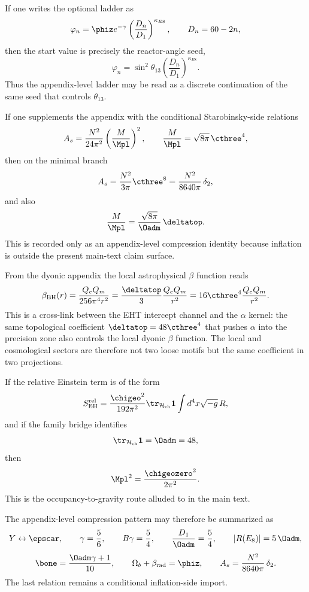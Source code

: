 \begin{remark}
If one writes the optional ladder as
\[
\varphi_n=\phiz e^{-\gamma}\left(\frac{D_n}{D_1}\right)^{\kappa_{E8}},
\qquad
D_n=60-2n,
\]
then the start value is precisely the reactor-angle seed,
\[
\varphi_n=\sin^2\theta_{13}\left(\frac{D_n}{D_1}\right)^{\kappa_{E8}}.
\]
Thus the appendix-level ladder may be read as a discrete continuation of the same seed that controls $\theta_{13}$.
\end{remark}

\begin{remark}
If one supplements the appendix with the conditional Starobinsky-side relations
\[
A_s=\frac{N^2}{24\pi^2}\left(\frac{M}{\Mpl}\right)^2,
\qquad
\frac{M}{\Mpl}=\sqrt{8\pi}\,\cthree^4,
\]
then on the minimal branch
\[
A_s=\frac{N^2}{3\pi}\cthree^8=\frac{N^2}{8640\pi}\,\delta_2,
\]
and also
\[
\frac{M}{\Mpl}=\frac{\sqrt{8\pi}}{\Oadm}\,\deltatop.
\]
This is recorded only as an appendix-level compression identity because inflation is outside the present main-text claim surface.
\end{remark}

\begin{remark}
From the dyonic appendix the local astrophysical $\beta$ function reads
\[
\beta_{\mathrm{BH}}(r)=\frac{Q_eQ_m}{256\pi^4 r^2}=\frac{\deltatop}{3}\frac{Q_eQ_m}{r^2}=16\cthree^4\frac{Q_eQ_m}{r^2}.
\]
This is a cross-link between the EHT intercept channel and the $\alpha$ kernel: the same topological coefficient $\deltatop=48\cthree^4$ that pushes $\alpha$ into the precision zone also controls the local dyonic $\beta$ function. The local and cosmological sectors are therefore not two loose motifs but the same coefficient in two projections.
\end{remark}

\begin{remark}
If the relative Einstein term is of the form
\[
S_{\mathrm{EH}}^{\mathrm{rel}}
=
\frac{\chigeo^2}{192\pi^2}\tr_{\mathcal H_{\mathrm{ch}}}\mathbf 1
\int d^4x\sqrt{-g}\,R,
\]
and if the family bridge identifies
\[
\tr_{\mathcal H_{\mathrm{ch}}}\mathbf 1=\Oadm=48,
\]
then
\[
\Mpl^2=\frac{\chigeozero^2}{2\pi^2}.
\]
This is the occupancy-to-gravity route alluded to in the main text.
\end{remark}

\begin{remark}
The appendix-level compression pattern may therefore be summarized as
\[
Y \leftrightarrow \epscar,
\qquad
\gamma=\frac56,
\qquad
B\gamma=\frac54,
\qquad
\frac{D_1}{\Oadm}=\frac54,
\qquad
|R(E_8)|=5\,\Oadm,
\]
\[
\bone=\frac{\Oadm\gamma+1}{10},
\qquad
\Omega_b+\beta_{\mathrm{rad}}=\phiz,
\qquad
A_s=\frac{N^2}{8640\pi}\,\delta_2.
\]
The last relation remains a conditional inflation-side import.
\end{remark}

